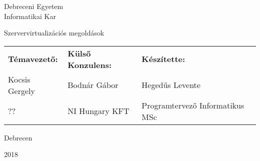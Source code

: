 \documentclass{memoir}
\begin{document}
\Large
\begin{center}
Debreceni Egyetem\\
Informatikai Kar
\end{center}

\vspace*{\fill}
\begin{vplace}[0.9]
\begin{center}
\HUGE
Szervervirtualizációs megoldások
\end{center}
\end{vplace}

\Large
\begin{tabu} to \linewidth{ X[c] X[c] X[c] }
\textbf{Témavezető:} & \textbf{Külső Konzulens:} & \textbf{ Készítette: }\\ 
Kocsis Gergely & Bodnár Gábor & Hegedűs Levente \\
?? & NI Hungary KFT & Programtervező Informatikus MSc \\
\end{tabu}


\vspace*{100pt}
\LARGE{
\begin{center}
Debrecen

2018
\end{center}
}
\end{document}
